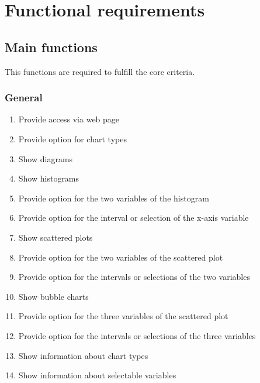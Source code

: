 \section{Functional requirements}


\renewcommand{\theenumi}{/F\arabic{enumi}0/}
\renewcommand{\labelenumi}{\theenumi}

  
\subsection{Main functions}

This functions are required to fulfill the core criteria.
 
\subsubsection*{General}
\begin{enumerate}
  \item Provide access via web page
    
  \item Provide option for chart types
  
  \item Show diagrams
  
  \item Show histograms %
  
  \item Provide option for the two variables of the histogram
  
  \item Provide option for the interval or selection of the x-axis variable %
  
  \item Show scattered plots %
  
  \item Provide option for the two variables of the scattered plot
  
  \item Provide option for the intervals or selections of the two variables %
  
  \item Show bubble charts %
  
  \item Provide option for the three variables of the scattered plot
  
  \item Provide option for the intervals or selections of the three variables %
  
  \item Show information about chart types
  
  \item Show information about selectable variables
  
\end{enumerate}


